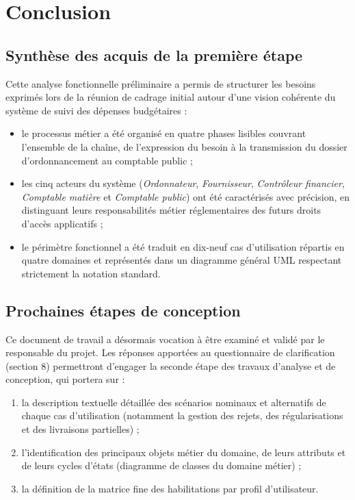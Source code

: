 \section{Conclusion}

\subsection{Synthèse des acquis de la première étape}

Cette analyse fonctionnelle préliminaire a permis de structurer les besoins exprimés lors de la réunion de cadrage initial autour d'une vision cohérente du système de suivi des dépenses budgétaires :

\begin{itemize}
  \item le processus métier a été organisé en quatre phases lisibles couvrant l'ensemble de la chaîne, de l'expression du besoin à la transmission du dossier d'ordonnancement au comptable public ;
  \item les cinq acteurs du système (\emph{Ordonnateur}, \emph{Fournisseur}, \emph{Contrôleur financier}, \emph{Comptable matière} et \emph{Comptable public}) ont été caractérisés avec précision, en distinguant leurs responsabilités métier réglementaires des futurs droits d'accès applicatifs ;
  \item le périmètre fonctionnel a été traduit en dix-neuf cas d'utilisation répartis en quatre domaines et représentés dans un diagramme général UML respectant strictement la notation standard.
\end{itemize}

\subsection{Prochaines étapes de conception}

Ce document de travail a désormais vocation à être examiné et validé par le responsable du projet. Les réponses apportées au questionnaire de clarification (section 8) permettront d'engager la seconde étape des travaux d'analyse et de conception, qui portera sur :

\begin{enumerate}
  \item la description textuelle détaillée des scénarios nominaux et alternatifs de chaque cas d'utilisation (notamment la gestion des rejets, des régularisations et des livraisons partielles) ;
  \item l'identification des principaux objets métier du domaine, de leurs attributs et de leurs cycles d'états (diagramme de classes du domaine métier) ;
  \item la définition de la matrice fine des habilitations par profil d'utilisateur.
\end{enumerate}
